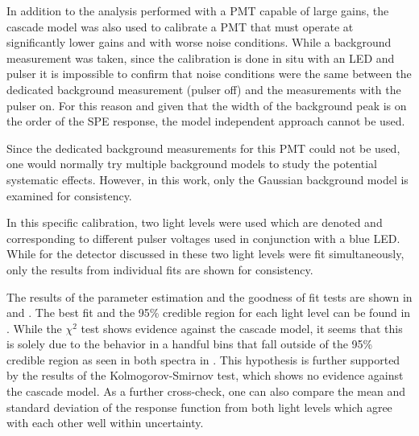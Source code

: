 In addition to the analysis performed with a PMT capable of large gains, the cascade model was also used to calibrate a PMT that must operate at significantly lower gains and with worse noise conditions.  While a background measurement was taken, since the calibration is done in situ with an LED and pulser it is impossible to confirm that noise conditions were the same between the dedicated background measurement (pulser off) and the measurements with the pulser on.  For this reason and given that the width of the background peak is on the order of the SPE response, the model independent approach cannot be used.  





Since the dedicated background measurements for this PMT could not be used, one would normally try multiple background models to study the potential systematic effects.  However, in this work, only the Gaussian background model is examined for consistency.

In this specific calibration, two light levels were used which are denoted  and  corresponding to different pulser voltages used in conjunction with a blue LED.  While for the detector discussed in  these two light levels were fit simultaneously, only the results from individual fits are shown for consistency.

The results of the parameter estimation and the goodness of fit tests are shown in  and .  The best fit and the 95\% credible region for each light level can be found in .  While the $\chi^2$ test shows evidence against the cascade model, it seems that this is solely due to the behavior in a handful bins that fall outside of the 95\% credible region as seen in both spectra in .  This hypothesis is further supported by the results of the Kolmogorov-Smirnov test, which shows no evidence against the cascade model.  As a further cross-check, one can also compare the mean and standard deviation of the response function from both light levels which agree with each other well within uncertainty.


